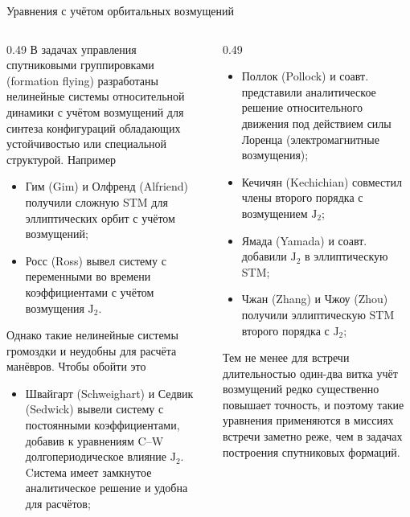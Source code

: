 \documentclass[8pt]{beamer}
\begin{document}
\begin{frame}{Уравнения с учётом орбитальных возмущений}
\begin{columns}[T,totalwidth=\textwidth]
  \begin{column}{0.49\textwidth}
    В задачах управления спутниковыми группировками (formation flying) разработаны нелинейные системы относительной динамики с учётом возмущений для синтеза конфигураций обладающих устойчивостью или специальной структурой. Например
    \begin{itemize}
        \item Гим (Gim) и Олфренд (Alfriend) \cite{gim2003state} получили сложную STM для эллиптических орбит с учётом возмущений;
        \item Росс (Ross) \cite{ross2003linearized} вывел систему с переменными во времени коэффициентами с учётом возмущения $\text{J}_2$.
    \end{itemize}
    
    Однако такие нелинейные системы громоздки и неудобны для расчёта манёвров. Чтобы обойти это
    \begin{itemize}
        \item Швайгарт (Schweighart) и Седвик (Sedwick) \cite{schweighart2002high} вывели систему с постоянными коэффициентами, добавив к уравнениям C–W долгопериодическое влияние $\text{J}_2$. Cистема имеет замкнутое аналитическое решение и удобна для расчётов;
    \end{itemize}
  \end{column}

  \begin{column}{0.49\textwidth}
    \begin{itemize}
        \item Поллок (Pollock) и соавт. \cite{pollock2011analytical} представили аналитическое решение относительного движения под действием силы Лоренца (электромагнитные возмущения);
        \item Кечичян (Kechichian) \cite{kechichian1992techniques} совместил члены второго порядка с возмущением $\text{J}_2$;
        \item Ямада (Yamada) и соавт. \cite{yamada2012new} добавили $\text{J}_2$ в эллиптическую STM;
        \item Чжан (Zhang) и Чжоу (Zhou) \cite{zhang2010second} получили эллиптическую STM второго порядка с $\text{J}_2$;
    \end{itemize}
    Тем не менее для встречи длительностью один-два витка учёт возмущений редко существенно повышает точность, и поэтому такие уравнения применяются в миссиях встречи заметно реже, чем в задачах построения спутниковых формаций.
  \end{column}
\end{columns}
\end{frame}
\end{document}
